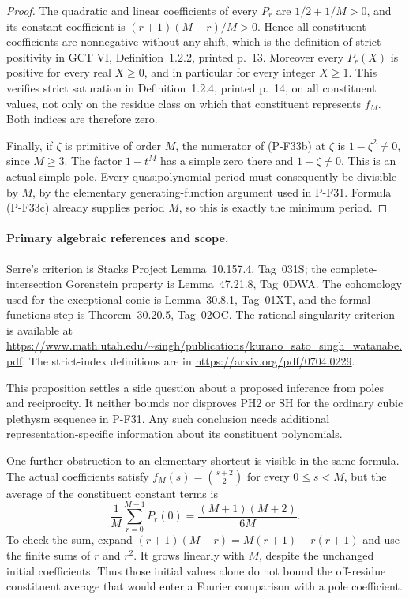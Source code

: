 \documentclass[11pt,a4paper]{article}
\begin{document}
\begin{proof}
The quadratic and linear coefficients of every
$P_r$ are $1/2+1/M>0$, and its constant coefficient
is $(r+1)(M-r)/M>0$. Hence all constituent coefficients
are nonnegative without any shift, which is the
definition of strict positivity in GCT VI,
Definition~1.2.2, printed p.~13. Moreover every
$P_r(X)$ is positive for every real $X\ge0$,
and in particular for every integer $X\ge1$.
This verifies strict saturation in Definition~1.2.4,
printed p.~14, on all constituent values, not only
on the residue class on which that constituent
represents $f_M$. Both indices are therefore zero.

Finally, if $\zeta$ is primitive of order $M$,
the numerator of (P-F33b) at $\zeta$ is
$1-\zeta^2\ne0$, since $M\ge3$.
The factor $1-t^M$ has a simple zero there
and $1-\zeta\ne0$. This is an actual simple pole.
Every quasipolynomial period must consequently
be divisible by $M$, by the elementary
generating-function argument used in P-F31.
Formula (P-F33c) already supplies period $M$,
so this is exactly the minimum period.
\end{proof}

\paragraph{Primary algebraic references and scope.}
Serre's criterion is Stacks Project
Lemma~10.157.4, Tag~031S; the complete-intersection
Gorenstein property is Lemma~47.21.8, Tag~0DWA.
The cohomology used for the exceptional conic is
Lemma~30.8.1, Tag~01XT, and the formal-functions
step is Theorem~30.20.5, Tag~02OC.
The rational-singularity criterion is available at
\url{https://www.math.utah.edu/~singh/publications/kurano_sato_singh_watanabe.pdf}.
The strict-index definitions are in
\url{https://arxiv.org/pdf/0704.0229}.

This proposition settles a side question about a
proposed inference from poles and reciprocity.
It neither bounds nor disproves PH2 or SH for the
ordinary cubic plethysm sequence in P-F31.
Any such conclusion needs additional
representation-specific information about its
constituent polynomials.

One further obstruction to an elementary shortcut is
visible in the same formula. The actual coefficients
satisfy $f_M(s)=\binom{s+2}{2}$ for every $0\le s<M$,
but the average of the constituent constant terms is
\[
 \frac1M\sum_{r=0}^{M-1}P_r(0)
       =\frac{(M+1)(M+2)}{6M}.
 \tag{P-F33j}
\]
To check the sum, expand
$(r+1)(M-r)=M(r+1)-r(r+1)$ and use
the finite sums of $r$ and $r^2$.
It grows linearly with $M$, despite the unchanged
initial coefficients. Thus those initial values alone
do not bound the off-residue constituent average
that would enter a Fourier comparison with a pole
coefficient.
\end{document}
